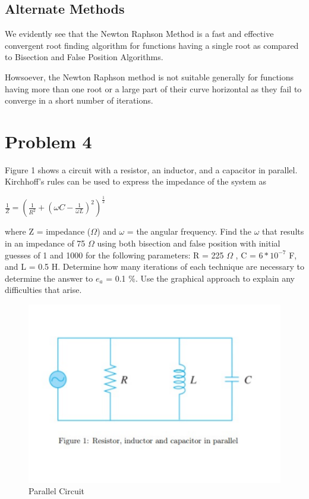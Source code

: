 \documentclass[titlepage, 11pt]{article}
\begin{document}
\subsection{Alternate Methods}
We evidently see that the Newton Raphson Method is a fast and effective convergent root finding algorithm for functions having a single root as compared to Bisection and False Position Algorithms.

Howsoever, the Newton Raphson method is not suitable generally for functions having more than one root or a large part of their curve horizontal as they fail to converge in a short number of iterations.
\newpage
\section{Problem 4}
Figure 1 shows a circuit with a resistor, an inductor, and a capacitor in parallel. Kirchhoff’s rules can be used to express the impedance of the system as \\
\begin{center}
     $ \frac{1}{Z} = (\frac{1}{R^2} + (\omega C-\frac{1}{\omega L})^2)^{\frac{1}{2}} $ \\
\end{center}
where Z = impedance ($\Omega$) and $\omega$ = the angular frequency. Find the $\omega$ that results in an impedance of 75 $\Omega$ using both bisection and false position with initial guesses of 1 and 1000 for the following parameters: R = 225 $\Omega$ , C = $6 * 10^{−7}$ F, and L = 0.5 H. Determine how many iterations of each technique are necessary to determine the answer to $e_a$ = 0.1 \%. Use the graphical approach to explain any difficulties that arise.
\begin{figure}[ht]
  \centering
  \includegraphics[width=\linewidth]{Question.pdf}
  \caption{Parallel Circuit}
  \label{fig:fig7a}
\end{figure}
\end{document}
